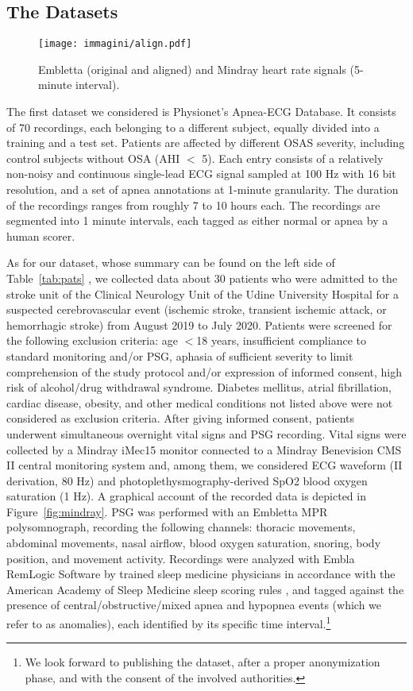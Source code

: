 \documentclass[5p,twocolumn,lefttitle]{elsarticle}
\begin{document}
\subsection{The Datasets}
\label{sec:domain}

\begin{figure}[t]
    \centering
    \texttt{[image: immagini/align.pdf]}
    \caption{Embletta (original and aligned) and Mindray heart rate signals (5-minute interval).}
    \label{fig:align}
\end{figure}

The first dataset we considered is Physionet's Apnea-ECG Database. It consists of 70 recordings, each belonging to a different subject, equally divided into a training and a test set. Patients are affected by different OSAS severity, including control subjects without OSA (AHI $<$ 5). Each entry consists of a relatively non-noisy and continuous single-lead ECG signal sampled at 100 Hz with 16 bit resolution, and a set of apnea annotations at 1-minute granularity. The duration of the recordings ranges from roughly 7 to 10 hours each. The recordings are segmented into 1 minute intervals, each tagged as either normal or apnea by a human scorer. 

As for our dataset, whose summary can be found on the left side of Table~\ref{tab:pats}
, we collected data about 30 patients who were admitted to the stroke unit of the Clinical Neurology Unit of the Udine University Hospital for a suspected cerebrovascular event (ischemic stroke, transient ischemic attack, or hemorrhagic stroke) from August 2019 to July 2020. Patients were screened for the following exclusion criteria: age $<$18 years, insufficient compliance to standard monitoring and/or PSG, aphasia of sufficient severity to limit comprehension of the study protocol and/or expression of informed consent, high risk of alcohol/drug withdrawal syndrome. Diabetes mellitus, atrial fibrillation, cardiac disease, obesity, and other medical conditions not listed above were not considered as exclusion criteria. 
After giving informed consent, patients 
underwent simultaneous overnight vital signs and PSG recording.
Vital signs were collected by a Mindray iMec15 monitor 
connected to a Mindray Benevision CMS II central monitoring system 
and, among them, we considered ECG waveform (II derivation, 80 Hz) and photoplethysmography-derived SpO2 blood oxygen saturation (1 Hz). A graphical account of the recorded data is depicted in Figure~\ref{fig:mindray}.
PSG was performed with an Embletta MPR polysomnograph, 
recording the following channels: thoracic movements, abdominal movements, nasal airflow, blood oxygen saturation, snoring, body position, and movement activity. Recordings were analyzed with Embla RemLogic Software 
by trained sleep medicine physicians in accordance with the American Academy of Sleep Medicine sleep scoring rules \cite{pmid23066376}, and tagged against the presence of central/obstructive/mixed apnea and hypopnea events (which we refer to as anomalies), each identified by its specific time interval.\footnote{We look forward to publishing the dataset, after a proper anonymization phase, and with the consent of the involved authorities.}
\end{document}
